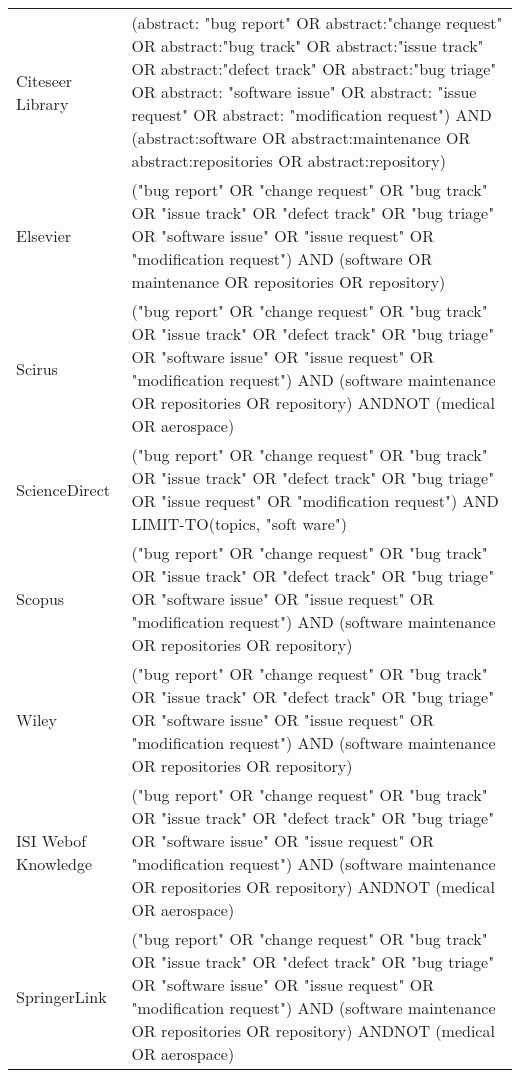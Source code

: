 \begin{table}[h]
\begin{tabular}{p{}p{}}
         Citeseer Library & (abstract: "bug report" OR abstract:"change request" OR abstract:"bug track" OR abstract:"issue track" OR
	     abstract:"defect track" OR abstract:"bug triage" OR abstract: "software
	     issue" OR abstract: "issue request" OR abstract: "modification request")
	     AND (abstract:software OR abstract:maintenance OR abstract:repositories OR
	     abstract:repository)\\

	     Elsevier & ("bug report" OR "change
	     request" OR "bug track" OR "issue track" OR "defect track" OR "bug triage" OR "software issue" OR  "issue request" OR
	    "modification request") AND (software OR maintenance OR repositories OR
	    repository)\\

	    Scirus & ("bug report" OR "change request" OR "bug track" OR "issue track" OR  "defect track" OR "bug triage" OR
        "software issue" OR  "issue request" OR "modification request") AND
	    (software maintenance OR repositories OR repository) ANDNOT (medical OR
	    aerospace)\\

	    ScienceDirect & ("bug report" OR "change request" OR "bug track"
	     OR "issue track" OR "defect track" OR "bug triage" OR "issue request" OR
	     "modification request") AND LIMIT-TO(topics, "soft ware")\\

	     Scopus & ("bug report" OR "change request" OR "bug track" OR
	     "issue track" OR  "defect track" OR "bug triage" OR "software issue" OR
	     "issue request" OR "modification request") AND (software maintenance OR
	     repositories OR repository)\\

	     Wiley & ("bug report" OR "change request"
	     OR "bug track" OR "issue track" OR  "defect track" OR "bug triage" OR
         "software issue" OR  "issue request" OR "modification request") AND
	     (software maintenance OR repositories OR repository)\\

	     ISI Web\newline of Knowledge & ("bug report" OR "change request" OR "bug
	     track" OR "issue track" OR  "defect track" OR "bug triage" OR "software issue" OR  "issue request" OR "modification request") AND
	    (software maintenance OR repositories OR repository) ANDNOT (medical OR
	    aerospace)\\

	    SpringerLink & ("bug report" OR "change request" OR "bug track" OR "issue track" OR  "defect track" OR "bug triage" OR
        "software issue" OR  "issue request" OR "modification request") AND
	    (software maintenance OR repositories OR repository) ANDNOT (medical OR
	    aerospace)\\
	\bottomrule
\end{tabular}
\end{table}